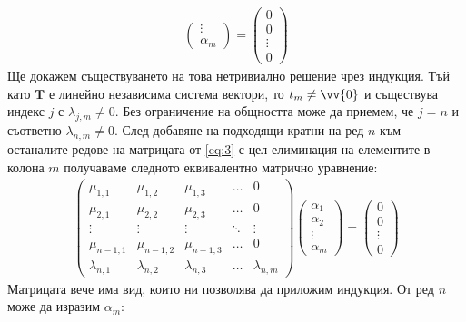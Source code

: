 \documentclass[a4paper,12pt,fleqn]{article}
\begin{document}
{\begin{gather}
\begin{pmatrix}
          \vdots \\
          \alpha_{m}
        \end{pmatrix}
        =
        \begin{pmatrix}
          0 \\
          0 \\
          \vdots \\
          0
        \end{pmatrix}
      \end{gather}
      Ще докажем съществуването на това нетривиално решение чрез индукция. Тъй като \( \textbf{T} \) е линейно независима система вектори, то \( t_{m} \neq \vv{0} \) и съществува индекс \( j \) с \( \lambda_{j,m} \neq 0 \). Без ограничение на общността може да приемем, че \( j = n \) и съответно \( \lambda_{n, m} \neq 0 \).
      След добавяне на подходящи кратни на ред \( n \) към останалите редове на матрицата от \eqref{eq:3} с цел елиминация на елементите в колона \( m \) получаваме следното еквивалентно матрично уравнение:
      \begin{gather}\label{eq:4}
        \begin{pmatrix}
          \mu_{1, 1} & \mu_{1, 2} & \mu_{1, 3} & \dots & 0 \\
          \mu_{2, 1} & \mu_{2, 2} & \mu_{2, 3} & \dots & 0 \\
          \vdots & \vdots & \vdots & \ddots & \vdots \\
          \mu_{n-1, 1} & \mu_{n-1, 2} & \mu_{n-1, 3} & \dots & 0 \\
          \lambda_{n, 1} & \lambda_{n, 2} & \lambda_{n, 3} & \dots & \lambda_{n, m} 
        \end{pmatrix}
        \begin{pmatrix}
          \alpha_{1} \\
          \alpha_{2} \\
          \vdots \\
          \alpha_{m}
        \end{pmatrix}
        =
        \begin{pmatrix}
          0 \\
          0 \\
          \vdots \\
          0
        \end{pmatrix}
      \end{gather}
      Матрицата вече има вид, които ни позволява да приложим индукция. От ред \( n \) може да изразим \( \alpha_{m} \):
      \begin{equation*}

\end{equation*}}
\end{document}
